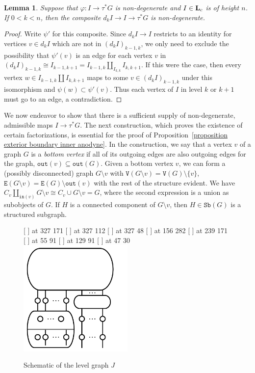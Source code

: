 \documentclass{amsart}
\numberwithin{theorem}{subsection}
\newtheorem{lemma}[theorem]{Lemma}
\theoremstyle{definition}
\newcommand{\name}[1]{\ensuremath{\text{\textup{#1}}}}
\newcommand{\levelg}{\mathbf{L}}
\newcommand{\levelgconn}{\levelg_{\name{c}}}
\newcommand{\sub}{\mathtt{Sb}}
\newcommand{\out}{\mathtt{out}}
\newcommand{\inp}{\mathtt{in}}
\newcommand{\edge}{\mathtt{E}}
\newcommand{\vertex}{\mathtt{V}}
\begin{document}
\begin{lemma}\label{lemma preservation of nondegeneracy}
Suppose that $\varphi \colon I \to \tau^* G$ is non-degenerate and $I \in \levelgconn$ is of height $n$.
If $0< k < n$, then the composite $d_k I \to I \to \tau^* G$ is non-degenerate.
\end{lemma}
\begin{proof}
Write $\psi'$ for this composite. 
Since $d_kI\to I$ restricts to an identity for vertices $v\in d_k I$ which are not in $(d_kI)_{k-1,k}$, we only need to exclude the possibility that $\psi'(v)$ is an edge for each vertex $v$ in $(d_kI)_{k-1,k} \cong I_{k-1,k+1} = I_{k-1,k} \amalg_{I_{k,k}} I_{k,k+1}$. 
If this were the case, then every vertex $w \in I_{k-1,k} \amalg I_{k,k+1}$ maps to some $v\in (d_kI)_{k-1,k}$ under this isomorphism and $\psi(w) \subset \psi'(v)$.
Thus each vertex of $I$ in level $k$ or $k+1$ must go to an edge, a contradiction.
\end{proof}

We now endeavor to show that there is a sufficient supply of non-degenerate, admissible maps $I \to \tau^*G$.
The next construction, which proves the existence of certain factorizations, is essential for the proof of Proposition~\ref{proposition exterior boundary inner anodyne}.
In the construction, we say that a vertex $v$ of a graph $G$ is a \emph{bottom vertex} if all of its outgoing edges are also outgoing edges for the graph, $\out(v) \subseteq \out(G)$.
Given a bottom vertex $v$, we can form a (possibly disconnected) graph $G\setminus v$ with $\vertex(G\setminus v) = \vertex(G) \setminus \{ v \}$, $\edge(G\setminus v) = \edge(G) \setminus \out(v)$ with the rest of the structure evident.
We have $C_v \amalg_{\inp(v)} G \setminus v \cong C_v \cup G\setminus v = G$, where the second expression is a union as subobjects of $G$.
If $H$ is a connected component of $G\setminus v$, then $H \in \sub(G)$ is a structured subgraph.

\begin{figure}[htb]
\small\hair 2pt
  [ ] at 327 171
  [ ] at 327 112
  [ ] at 327 48
  [ ] at 156 282
  [ ] at 239 171
  [ ] at 55 91
  [ ] at 129 91
  [ ] at 47 30
\endlabellist
\centering
\includegraphics[width=0.5\textwidth]{filtration}
\caption{Schematic of the level graph $J$}
\label{figure J schematic picture}
\end{figure}
\end{document}
